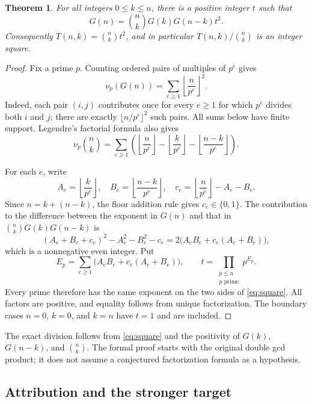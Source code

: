 \documentclass[11pt]{article}
\newtheorem{theorem}{Theorem}[section]
\begin{document}
\begin{theorem}
For all integers $0\le k\le n$, there is a positive integer $t$ such that
\begin{equation}
 G(n)=\binom nk G(k)G(n-k)t^2.
 \label{eq:square}
\end{equation}
Consequently $T(n,k)=\binom nk t^2$, and in particular
$T(n,k)/\binom nk$ is an integer square.
\end{theorem}
\begin{proof}
Fix a prime $p$. Counting ordered pairs of multiples of $p^e$ gives
\begin{equation}
 \nu_p(G(n))=\sum_{e\ge1}\left\lfloor\frac{n}{p^e}\right\rfloor^2.
 \label{eq:gcd-valuation}
\end{equation}
Indeed, each pair $(i,j)$ contributes once for every $e\ge1$ for which
$p^e$ divides both $i$ and $j$; there are exactly
$\lfloor n/p^e\rfloor^2$ such pairs. All sums below have finite support.
Legendre's factorial formula also gives
\[
 \nu_p\binom nk=\sum_{e\ge1}
 \left(\left\lfloor\frac n{p^e}\right\rfloor
 -\left\lfloor\frac k{p^e}\right\rfloor
 -\left\lfloor\frac{n-k}{p^e}\right\rfloor\right).
\]

For each $e$, write
\[
 A_e=\left\lfloor\frac k{p^e}\right\rfloor,\quad
 B_e=\left\lfloor\frac{n-k}{p^e}\right\rfloor,\quad
 c_e=\left\lfloor\frac n{p^e}\right\rfloor-A_e-B_e.
\]
Since $n=k+(n-k)$, the floor addition rule gives $c_e\in\{0,1\}$.
The contribution to the difference between the exponent in $G(n)$ and
that in $\binom nk G(k)G(n-k)$ is
\[
 (A_e+B_e+c_e)^2-A_e^2-B_e^2-c_e
 =2\bigl(A_eB_e+c_e(A_e+B_e)\bigr),
\]
which is a nonnegative even integer. Put
\[
 E_p=\sum_{e\ge1}\bigl(A_eB_e+c_e(A_e+B_e)\bigr),\qquad
 t=\prod_{\substack{p\le n\\p\text{ prime}}}p^{E_p}.
\]
Every prime therefore has the same exponent on the two sides of
\eqref{eq:square}. All factors are positive, and equality follows from
unique factorization. The boundary cases $n=0$, $k=0$, and $k=n$ have
$t=1$ and are included.
\end{proof}

The exact division follows from \eqref{eq:square} and the positivity of
$G(k)$, $G(n-k)$, and $\binom nk$. The formal proof starts with the
original double gcd product; it does not assume a conjectured
factorization formula as a hypothesis.

\subsection{Attribution and the stronger target}
\end{document}
